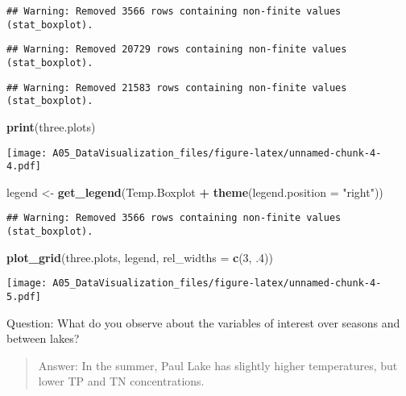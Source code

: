 \documentclass[]{article}
\newenvironment{Shaded}{\begin{snugshade}}{\end{snugshade}}
\newcommand{\KeywordTok}[1]{\textcolor[rgb]{0.13,0.29,0.53}{\textbf{#1}}}
\newcommand{\DataTypeTok}[1]{\textcolor[rgb]{0.13,0.29,0.53}{#1}}
\newcommand{\DecValTok}[1]{\textcolor[rgb]{0.00,0.00,0.81}{#1}}
\newcommand{\StringTok}[1]{\textcolor[rgb]{0.31,0.60,0.02}{#1}}
\newcommand{\OperatorTok}[1]{\textcolor[rgb]{0.81,0.36,0.00}{\textbf{#1}}}
\newcommand{\NormalTok}[1]{#1}
\begin{document}
\begin{verbatim}
## Warning: Removed 3566 rows containing non-finite values (stat_boxplot).
\end{verbatim}

\begin{verbatim}
## Warning: Removed 20729 rows containing non-finite values (stat_boxplot).
\end{verbatim}

\begin{verbatim}
## Warning: Removed 21583 rows containing non-finite values (stat_boxplot).
\end{verbatim}

\begin{Shaded}
\begin{Highlighting}[]
\KeywordTok{print}\NormalTok{(three.plots)}
\end{Highlighting}
\end{Shaded}

\texttt{[image: A05\_DataVisualization\_files/figure-latex/unnamed-chunk-4-4.pdf]}

\begin{Shaded}
\begin{Highlighting}[]
\NormalTok{legend <-}\StringTok{ }\KeywordTok{get_legend}\NormalTok{(Temp.Boxplot }\OperatorTok{+}\StringTok{ }\KeywordTok{theme}\NormalTok{(}\DataTypeTok{legend.position =} \StringTok{"right"}\NormalTok{))}
\end{Highlighting}
\end{Shaded}

\begin{verbatim}
## Warning: Removed 3566 rows containing non-finite values (stat_boxplot).
\end{verbatim}

\begin{Shaded}
\begin{Highlighting}[]
\KeywordTok{plot_grid}\NormalTok{(three.plots, legend, }\DataTypeTok{rel_widths =} \KeywordTok{c}\NormalTok{(}\DecValTok{3}\NormalTok{, .}\DecValTok{4}\NormalTok{))}
\end{Highlighting}
\end{Shaded}

\texttt{[image: A05\_DataVisualization\_files/figure-latex/unnamed-chunk-4-5.pdf]}

Question: What do you observe about the variables of interest over
seasons and between lakes?

\begin{quote}
Answer: In the summer, Paul Lake has slightly higher temperatures, but
lower TP and TN concentrations.
\end{quote}
\end{document}
